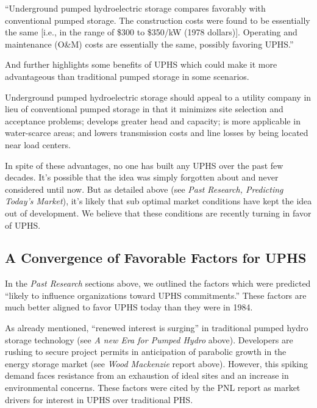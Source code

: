 \documentclass[hidelinks,12pt,a4paper]{article}
\begin{document}
\begin{displayquote}
“Underground pumped hydroelectric storage compares favorably with conventional pumped storage. The construction costs were found to be essentially the same [i.e., in the range of \$300 to \$350/kW (1978 dollars)]. Operating and maintenance (O\&M) costs are essentially the same, possibly favoring UPHS.” \cite{UndergroundPumpedHydroelectricStorage}
\end{displayquote}

And further highlights some benefits of UPHS which could make it more advantageous than traditional pumped storage in some scenarios.

\begin{displayquote}
Underground pumped hydroelectric storage should appeal to a utility company in lieu of conventional pumped storage in that it minimizes site selection and acceptance problems; develops greater head and capacity; is more applicable in water-scarce areas; and lowers transmission costs and line losses by being located near load centers. \cite{UndergroundPumpedHydroelectricStorage}
\end{displayquote}


In spite of these advantages, no one has built any UPHS over the past few decades. It's possible that the idea was simply forgotten about and never considered until now. But as detailed above (see \textit{Past Research, Predicting Today's Market}), it's likely that sub optimal market conditions have kept the idea out of development. We believe that these conditions are recently turning in favor of UPHS.

\subsection{A Convergence of Favorable Factors for UPHS}
In the \textit{Past Research} sections above, we outlined the factors which were predicted “likely to influence organizations toward UPHS commitments.” These factors are much better aligned to favor UPHS today than they were in 1984.

As already mentioned, “renewed interest is surging” in traditional pumped hydro storage technology (see \textit{A new Era for Pumped Hydro} above). Developers are rushing to secure project permits in anticipation of parabolic growth in the energy storage market (see \textit{Wood Mackenzie} report above). However, this spiking demand faces resistance from an exhaustion of ideal sites and an increase in environmental concerns. These factors were cited by the PNL report as market drivers for interest in UPHS over traditional PHS.
\end{document}
